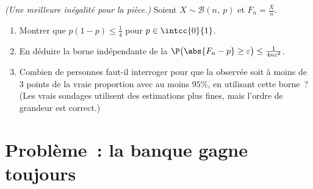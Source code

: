 \begin{exercise}[$\star\star\star$]\label{exo:g12:sums:8}
\emph{(Une meilleure inégalité pour la pièce.)} Soient
$X \sim \mathcal B(n,\ p)$ et $F_n = \frac Xn$.
\begin{enumerate}
  \item Montrer que $p(1-p) \leq \frac14$ pour $p \in \intcc{0}{1}$.
  \item En déduire la borne indépendante de la 
        $\P\bigl(\abs{F_n - p} \geq \varepsilon\bigr) \leq
        \frac{1}{4n\varepsilon^2}$.
  \item Combien de personnes faut-il interroger pour que la 
        observée soit à moins de $3$ points de la vraie proportion avec
         au moins $95\%$, en utilisant cette borne~? (Les
        vrais sondages utilisent des estimations plus fines, mais l'ordre
        de grandeur est correct.)
\end{enumerate}
\end{exercise}

\section{Problème~: la banque gagne toujours}

